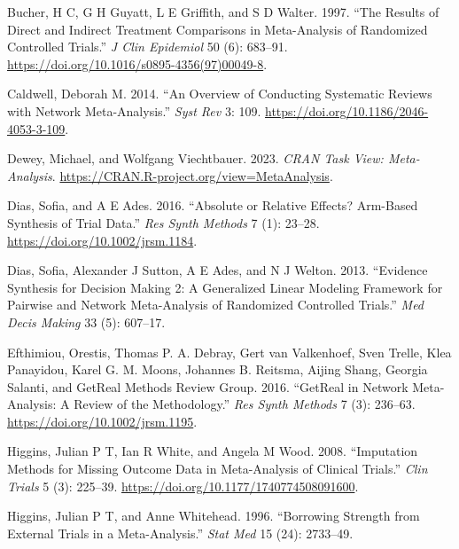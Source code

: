 \hypertarget{refs}{}
\begin{CSLReferences}{1}{0}
\leavevmode{}%
Bucher, H C, G H Guyatt, L E Griffith, and S D Walter. 1997. {``The Results of Direct and Indirect Treatment Comparisons in Meta-Analysis of Randomized Controlled Trials.''} \emph{J Clin Epidemiol} 50 (6): 683--91. \url{https://doi.org/10.1016/s0895-4356(97)00049-8}.

\leavevmode{}%
Caldwell, Deborah M. 2014. {``An Overview of Conducting Systematic Reviews with Network Meta-Analysis.''} \emph{Syst Rev} 3: 109. \url{https://doi.org/10.1186/2046-4053-3-109}.

\leavevmode{}%
Dewey, Michael, and Wolfgang Viechtbauer. 2023. \emph{{CRAN Task View}: Meta-Analysis}. \url{https://CRAN.R-project.org/view=MetaAnalysis}.

\leavevmode{}%
Dias, Sofia, and A E Ades. 2016. {``Absolute or Relative Effects? Arm-Based Synthesis of Trial Data.''} \emph{Res Synth Methods} 7 (1): 23--28. \url{https://doi.org/10.1002/jrsm.1184}.

\leavevmode{}%
Dias, Sofia, Alexander J Sutton, A E Ades, and N J Welton. 2013. {``Evidence Synthesis for Decision Making 2: A Generalized Linear Modeling Framework for Pairwise and Network Meta-Analysis of Randomized Controlled Trials.''} \emph{Med Decis Making} 33 (5): 607--17.

\leavevmode{}%
Efthimiou, Orestis, Thomas P. A. Debray, Gert van Valkenhoef, Sven Trelle, Klea Panayidou, Karel G. M. Moons, Johannes B. Reitsma, Aijing Shang, Georgia Salanti, and GetReal Methods Review Group. 2016. {``GetReal in Network Meta-Analysis: A Review of the Methodology.''} \emph{Res Synth Methods} 7 (3): 236--63. \url{https://doi.org/10.1002/jrsm.1195}.

\leavevmode{}%
Higgins, Julian P T, Ian R White, and Angela M Wood. 2008. {``Imputation Methods for Missing Outcome Data in Meta-Analysis of Clinical Trials.''} \emph{Clin Trials} 5 (3): 225--39. \url{https://doi.org/10.1177/1740774508091600}.

\leavevmode{}%
Higgins, Julian P T, and Anne Whitehead. 1996. {``Borrowing Strength from External Trials in a Meta-Analysis.''} \emph{Stat Med} 15 (24): 2733--49.


\end{CSLReferences}
